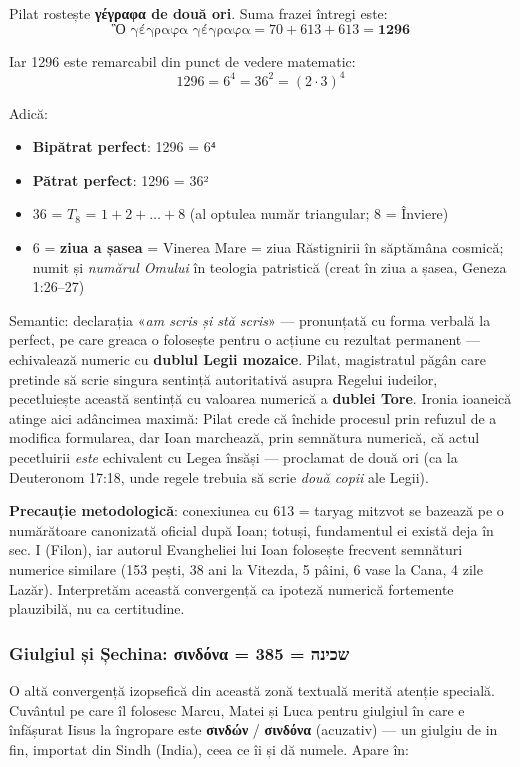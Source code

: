 \documentclass[12pt,a4paper,twoside,openany]{book}
\begin{document}
Pilat rostește \textbf{γέγραφα de două ori}. Suma frazei întregi este:
\[
\text{Ὃ γέγραφα γέγραφα} = 70 + 613 + 613 = \mathbf{1296}
\]

Iar 1296 este remarcabil din punct de vedere matematic:
\[
1296 = 6^4 = 36^2 = (2 \cdot 3)^4
\]

Adică:
\begin{itemize}
  \item \textbf{Bipătrat perfect}: 1296 = 6⁴
  \item \textbf{Pătrat perfect}: 1296 = 36²
  \item 36 = $T_8$ = $1+2+\ldots+8$ (al optulea număr triangular; 8 = Înviere)
  \item 6 = \textbf{ziua a șasea} = Vinerea Mare = ziua Răstignirii în săptămâna cosmică; numit și \textit{numărul Omului} în teologia patristică (creat în ziua a șasea, Geneza 1:26--27)
\end{itemize}

Semantic: declarația «\textit{am scris și stă scris}» — pronunțată cu forma verbală la perfect, pe care greaca o folosește pentru o acțiune cu rezultat permanent — echivalează numeric cu \textbf{dublul Legii mozaice}. Pilat, magistratul păgân care pretinde să scrie singura sentință autoritativă asupra Regelui iudeilor, pecetluiește această sentință cu valoarea numerică a \textbf{dublei Tore}. Ironia ioaneică atinge aici adâncimea maximă: Pilat crede că închide procesul prin refuzul de a modifica formularea, dar Ioan marchează, prin semnătura numerică, că actul pecetluirii \textit{este} echivalent cu Legea însăși — proclamat de două ori (ca la Deuteronom 17:18, unde regele trebuia să scrie \textit{două copii} ale Legii).

\textbf{Precauție metodologică}: conexiunea cu 613 = taryag mitzvot se bazează pe o numărătoare canonizată oficial după Ioan; totuși, fundamentul ei există deja în sec. I (Filon), iar autorul Evangheliei lui Ioan folosește frecvent semnături numerice similare (153 pești, 38 ani la Vitezda, 5 pâini, 6 vase la Cana, 4 zile Lazăr). Interpretăm această convergență ca ipoteză numerică fortemente plauzibilă, nu ca certitudine.

\subsubsection*{Giulgiul și Șechina: σινδόνα = שכינה = 385}

O altă convergență izopsefică din această zonă textuală merită atenție specială. Cuvântul pe care îl folosesc Marcu, Matei și Luca pentru giulgiul în care e înfășurat Iisus la îngropare este \textbf{σινδών} / \textbf{σινδόνα} (acuzativ) — un giulgiu de in fin, importat din Sindh (India), ceea ce îi și dă numele. Apare în:
\end{document}
